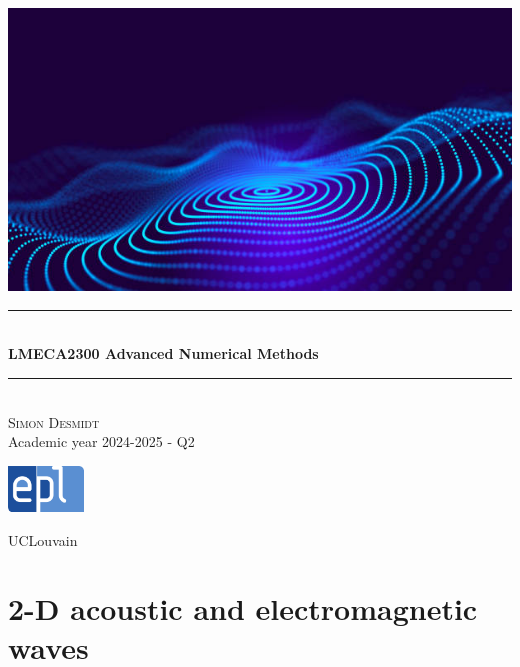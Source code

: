 \documentclass[12pt, openany]{report}
\newcommand{\HRule}{\rule{\linewidth}{0.5mm}}
\theoremstyle{definition}
\begin{document}
\begin{titlepage}
    \begin{sffamily}
    \begin{center}
        \includegraphics[scale=0.25]{img/page_de_garde.png} \\[1cm]
        \HRule \\[0.4cm]
        { \huge \bfseries LMECA2300 Advanced Numerical Methods \\[0.4cm] }
    
        \HRule \\[1.5cm]
        \textsc{\LARGE Simon Desmidt}\\[1cm]
        \vfill
        \vspace{2cm}
        {\large Academic year 2024-2025 - Q2}
        \vspace{0.4cm}
         
        \includegraphics[width=0.15\textwidth]{img/epl.png}
        
        UCLouvain\\
    
    \end{center}
    \end{sffamily}
\end{titlepage}

\setcounter{tocdepth}{1}
\tableofcontents
\chapter{2-D acoustic and electromagnetic waves}
\end{document}

